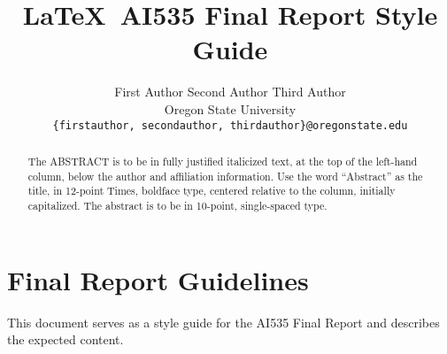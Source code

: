 \documentclass[10pt,twocolumn,letterpaper]{article}
\begin{document}
\title{\LaTeX\ AI535 Final Report Style Guide}

\author{First Author \hspace{20pt} Second Author \hspace{20 pt} Third Author\\
Oregon State University\\
{\tt\small \{firstauthor, secondauthor, thirdauthor\}@oregonstate.edu}
}
\maketitle

\begin{abstract}
   The ABSTRACT is to be in fully justified italicized text, at the top of the left-hand column, below the author and affiliation information.
   Use the word ``Abstract'' as the title, in 12-point Times, boldface type, centered relative to the column, initially capitalized.
   The abstract is to be in 10-point, single-spaced type.
\end{abstract}

\section{Final Report Guidelines}
\label{sec:intro}

This document serves as a style guide for the AI535 Final Report and describes the expected content. 
\end{document}
